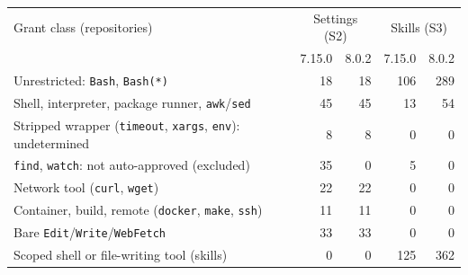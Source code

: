 \begin{tabular}{@{}lrrrr@{}}
\toprule
Grant class (repositories) & \multicolumn{2}{c}{Settings (S2)} & \multicolumn{2}{c}{Skills (S3)} \\
 & 7.15.0 & 8.0.2 & 7.15.0 & 8.0.2 \\
\midrule
Unrestricted: \texttt{Bash}, \texttt{Bash(*)} & 18 & 18 & 106 & 289 \\
Shell, interpreter, package runner, \texttt{awk}/\texttt{sed} & 45 & 45 & 13 & 54 \\
Stripped wrapper (\texttt{timeout}, \texttt{xargs}, \texttt{env}): undetermined & 8 & 8 & 0 & 0 \\
\texttt{find}, \texttt{watch}: not auto-approved (excluded) & 35 & 0 & 5 & 0 \\
Network tool (\texttt{curl}, \texttt{wget}) & 22 & 22 & 0 & 0 \\
Container, build, remote (\texttt{docker}, \texttt{make}, \texttt{ssh}) & 11 & 11 & 0 & 0 \\
Bare \texttt{Edit}/\texttt{Write}/\texttt{WebFetch} & 33 & 33 & 0 & 0 \\
Scoped shell or file-writing tool (skills) & 0 & 0 & 125 & 362 \\
\bottomrule
\end{tabular}
